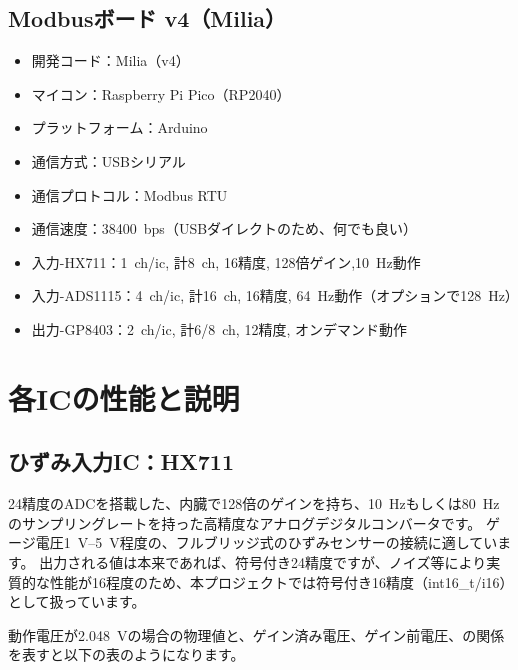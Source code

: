 \subsection{Modbusボード v4（Milia）}
\begin{itemize}
    \item 開発コード：Milia（v4）
    \item マイコン：Raspberry Pi Pico（RP2040）
    \item プラットフォーム：Arduino
    \item 通信方式：USBシリアル
    \item 通信プロトコル：Modbus RTU
    \item 通信速度：\qty{38400}{bps}（USBダイレクトのため、何でも良い）
    \item 入力-HX711：\qty{1}{ch}/ic, 計\qty{8}{ch}, \qty{16}{\bit}精度, 128倍ゲイン,\qty{10}{\Hz}動作
    \item 入力-ADS1115：\qty{4}{ch}/ic, 計\qty{16}{ch}, \qty{16}{\bit}精度, \qty{64}{\Hz}動作（オプションで\qty{128}{\Hz}）
    \item 出力-GP8403：\qty{2}{ch}/ic, 計6/\qty{8}{ch}, \qty{12}{\bit}精度, オンデマンド動作
\end{itemize}

\section{各ICの性能と説明}
\subsection{ひずみ入力IC：HX711}
\qty{24}{\bit}精度のADCを搭載した、内臓で128倍のゲインを持ち、\qty{10}{\Hz}もしくは\qty{80}{\Hz}のサンプリングレートを持った高精度なアナログデジタルコンバータです。
ゲージ電圧\qtyrange{1}{5}{\V}程度の、フルブリッジ式のひずみセンサーの接続に適しています。
出力される値は本来であれば、符号付き\qty{24}{\bit}精度ですが、ノイズ等により実質的な性能が\qty{16}{\bit}程度のため、本プロジェクトでは符号付き\qty{16}{\bit}精度（int16\_t/i16）として扱っています。

動作電圧が\qty{2.048}{\V}の場合の物理値と、ゲイン済み電圧、ゲイン前電圧、の関係を表すと以下の表のようになります。

